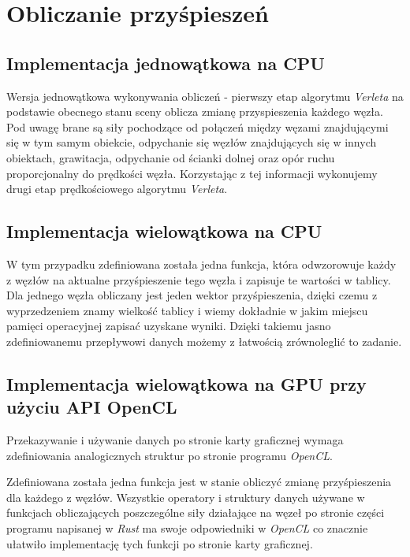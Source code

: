 \documentclass[12pt, letterpaper]{report}
\begin{document}
    \section{Obliczanie przyśpieszeń}
    \subsection{Implementacja jednowątkowa na CPU}
    
    Wersja jednowątkowa wykonywania obliczeń - pierwszy etap algorytmu \emph{Verleta} na podstawie 
    obecnego stanu sceny oblicza zmianę przyspieszenia każdego węzła. 
    Pod uwagę brane są siły pochodzące od połączeń między węzami znajdującymi 
    się w tym samym obiekcie, odpychanie się węzłów znajdujących się w innych obiektach, 
    grawitacja, odpychanie od ścianki dolnej oraz opór ruchu proporcjonalny do prędkości węzła.
    Korzystając z tej informacji wykonujemy drugi etap prędkościowego algorytmu \emph{Verleta}.

    \clearpage
    \subsection{Implementacja wielowątkowa na CPU}
    
    W tym przypadku zdefiniowana została jedna funkcja, która odwzorowuje każdy z 
    węzłów na aktualne przyśpieszenie tego węzła i zapisuje te wartości w tablicy.
    Dla jednego węzła obliczany jest jeden wektor przyśpieszenia, dzięki czemu z wyprzedzeniem
    znamy wielkość tablicy i wiemy dokładnie w 
    jakim miejscu pamięci operacyjnej zapisać uzyskane wyniki.
    Dzięki takiemu jasno zdefiniowanemu przepływowi danych możemy z łatwością zrównoleglić to zadanie.

    \clearpage
    \subsection{Implementacja wielowątkowa na GPU przy użyciu API OpenCL}
    
    Przekazywanie i używanie danych po stronie karty graficznej wymaga zdefiniowania analogicznych
    struktur po stronie programu \emph{OpenCL}.

    
    Zdefiniowana została jedna funkcja jest w stanie obliczyć zmianę przyśpieszenia 
    dla każdego z węzłów. Wszystkie operatory i struktury danych używane w funkcjach
    obliczających poszczególne siły działające na węzeł po stronie części programu napisanej
    w \emph{Rust} ma swoje odpowiedniki w \emph{OpenCL} co znacznie ułatwiło implementację
    tych funkcji po stronie karty graficznej. 
\end{document}
